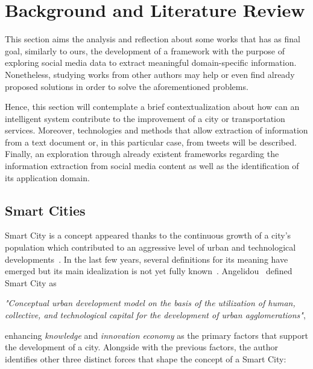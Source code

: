 \chapter{Background and Literature Review} \label{chap:sota}

\minitoc \mtcskip \noindent

This section aims the analysis and reflection about some works that has as final goal, similarly to ours, the development of a framework with the purpose of exploring social media data to extract meaningful domain-specific information. Nonetheless, studying works from other authors may help or even find already proposed solutions in order to solve the aforementioned problems.

Hence, this section will contemplate a brief contextualization about how can an intelligent system contribute to the improvement of a city or transportation services. Moreover, technologies and methods that allow extraction of information from a text document or, in this particular case, from tweets will be described. Finally, an exploration through already existent frameworks regarding the information extraction from social media content as well as the identification of its application domain.

\section{Smart Cities}\label{sec:smart_cities}

Smart City is a concept appeared thanks to the continuous growth of a city's population which contributed to an aggressive level of urban and technological developments~\cite{ulloa2016mining}. In the last few years, several definitions for its meaning have emerged but its main idealization is not yet fully known~\cite{komninos2009intelligent}. Angelidou~\cite{angelidou2015smart} defined Smart City as

\emph{"Conceptual urban development model on the basis of the utilization of human, collective, and technological capital for the development of urban agglomerations"},

enhancing \textit{knowledge} and \textit{innovation economy} as the primary factors that support the development of a city. Alongside with the previous factors, the author identifies other three distinct forces that shape the concept of a Smart City:

